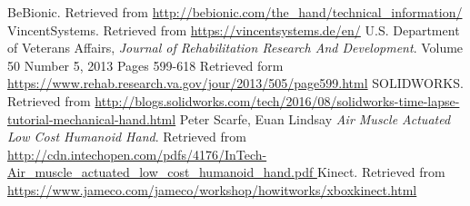 \documentclass{article}
\begin{document}
\break
\begin{thebibliography}{1}
	 BeBionic. Retrieved from {\url{http://bebionic.com/the_hand/technical_information/}} 
	 VincentSystems. Retrieved from {\url{  https://vincentsystems.de/en/}} 
	 U.S. Department of Veterans Affairs, {\em Journal of Rehabilitation Research And Development}. Volume 50 Number 5, 2013
   Pages 599-618 Retrieved form {\url{https://www.rehab.research.va.gov/jour/2013/505/page599.html}}
	 SOLIDWORKS. Retrieved from {\url{ http://blogs.solidworks.com/tech/2016/08/solidworks-time-lapse-tutorial-mechanical-hand.html}}
	 Peter Scarfe, Euan Lindsay {\em Air Muscle Actuated Low Cost Humanoid Hand}. Retrieved from {\url{ http://cdn.intechopen.com/pdfs/4176/InTech-Air_muscle_actuated_low_cost_humanoid_hand.pdf
}} 
	 Kinect. Retrieved from {\url{https://www.jameco.com/jameco/workshop/howitworks/xboxkinect.html}}
	
\end{thebibliography}
  
\end{document}
